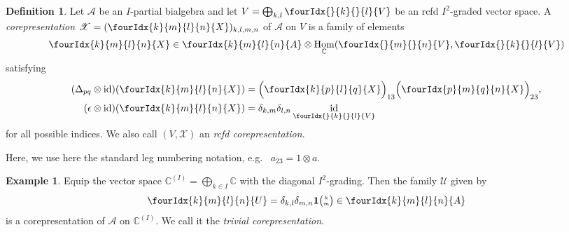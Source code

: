 \documentclass[11pt]{article}
\DeclareMathOperator{\id}{id}
\DeclareMathOperator{\Hom}{Hom}
\newcommand{\C}{\mathbb{C}}
\newcommand{\Grt}[3]{#1{\tiny {\begin{pmatrix} #2\\#3\end{pmatrix}}}}
\newcommand{\UnitC}[2]{\Grt{\mathbf{1}}{#1}{#2}}
\newcommand{\Gr}[5]{\fourIdx{#2}{#4}{#3}{#5}{#1}}%
\newcommand{\Gru}[3]{\Gr{#1}{}{}{#2}{#3}}
\theoremstyle{definition}
\newtheorem{Def}[Theorem]{Definition}
\newtheorem{Exa}[Theorem]{Example}
\numberwithin{equation}{section}
\begin{document}
\begin{Def} \label{definition:corep} Let $\mathscr{A}$ be an
  $I$-partial bialgebra and let $V=\bigoplus_{k,l} \Gru{V}{k}{l}$
   be
an rcfd $I^{2}$-graded vector space.  A \emph{corepresentation}
  $\mathscr{X}=(\Gr{X}{k}{l}{m}{n})_{k,l,m,n}$ of $\mathscr{A}$ on $V$
  is a family of elements
 \begin{align} \label{eq:rep-blocks}
   \Gr{X}{k}{l}{m}{n} \in \Gr{A}{k}{l}{m}{n} \otimes
  \Hom_\C(\Gru{V}{m}{n},\Gru{V}{k}{l})
 \end{align}
 satisfying 
 \begin{align}
   \label{eq:rep-comultiplication}
    (\Delta_{pq} \otimes
    \id)(\Gr{X}{k}{l}{m}{n}) &=
    \Big{(}\Gr{X}{k}{l}{p}{q}\Big{)}_{13}\Big{(}\Gr{X}{p}{q}{m}{n}\Big{)}_{23},
    \\ \label{eq:rep-counit}
(\epsilon \otimes
  \id)(\Gr{X}{k}{l}{m}{n})&=\delta_{k,m}\delta_{l,n}\id_{\Gru{V}{k}{l}}
 \end{align}
  for all possible indices. We also call $(V,\mathscr{X})$ an
  \emph{rcfd corepresentation}.
\end{Def}
Here, we use here the standard leg numbering notation, e.g.~ $a_{23}=1\otimes a$.
\begin{Exa} \label{example:rep-triv} Equip the vector space
  $\C^{(I)}=\bigoplus_{k\in I} \C$ with the diagonal
  $I^{2}$-grading. Then the family $\mathscr{U}$ given by
  \begin{align} \label{eq:rep-triv}
    \Gr{U}{k}{l}{m}{n} = \delta_{k,l}\delta_{m,n} \UnitC{k}{m} \in
    \Gr{A}{k}{l}{m}{n}
  \end{align}
is a corepresentation of $\mathscr{A}$ on $\C^{(I)}$. We call it the
\emph{trivial corepresentation}.
\end{Exa}
\end{document}

